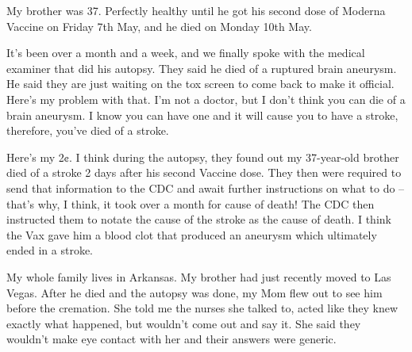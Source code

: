 My brother was 37. Perfectly healthy until he got his second dose of Moderna
Vaccine on Friday 7th May, and he died on Monday 10th May.

It’s been over a month and a week, and we finally spoke with the medical
examiner that did his autopsy. They said he died of a ruptured brain
aneurysm. He said they are just waiting on the tox screen to come back to make
it official. Here’s my problem with that. I’m not a doctor, but I don’t think
you can die of a brain aneurysm. I know you can have one and it will cause you
to have a stroke, therefore, you’ve died of a stroke.

Here’s my 2¢. I think during the autopsy, they found out my 37-year-old brother
died of a stroke 2 days after his second Vaccine dose. They then were required
to send that information to the CDC and await further instructions on what to do
– that’s why, I think, it took over a month for cause of death! The CDC then
instructed them to notate the cause of the stroke as the cause of death. I think
the Vax gave him a blood clot that produced an aneurysm which ultimately ended
in a stroke.

My whole family lives in Arkansas. My brother had just recently moved to Las
Vegas. After he died and the autopsy was done, my Mom flew out to see him before
the cremation. She told me the nurses she talked to, acted like they knew
exactly what happened, but wouldn’t come out and say it. She said they wouldn’t
make eye contact with her and their answers were generic.

